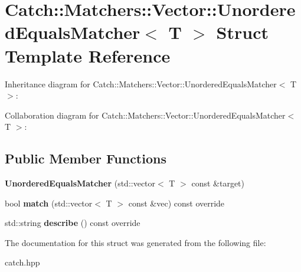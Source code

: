 \hypertarget{structCatch_1_1Matchers_1_1Vector_1_1UnorderedEqualsMatcher}{}\section{Catch\+:\+:Matchers\+:\+:Vector\+:\+:Unordered\+Equals\+Matcher$<$ T $>$ Struct Template Reference}
\label{structCatch_1_1Matchers_1_1Vector_1_1UnorderedEqualsMatcher}


Inheritance diagram for Catch\+:\+:Matchers\+:\+:Vector\+:\+:Unordered\+Equals\+Matcher$<$ T $>$\+:


Collaboration diagram for Catch\+:\+:Matchers\+:\+:Vector\+:\+:Unordered\+Equals\+Matcher$<$ T $>$\+:
\subsection*{Public Member Functions}
\begin{DoxyCompactItemize}
\item 
{\bfseries Unordered\+Equals\+Matcher} (std\+::vector$<$ T $>$ const \&target)\hypertarget{structCatch_1_1Matchers_1_1Vector_1_1UnorderedEqualsMatcher_a525905639b2b15b52ddb0bf14bfa19da}{}\label{structCatch_1_1Matchers_1_1Vector_1_1UnorderedEqualsMatcher_a525905639b2b15b52ddb0bf14bfa19da}

\item 
bool {\bfseries match} (std\+::vector$<$ T $>$ const \&vec) const override\hypertarget{structCatch_1_1Matchers_1_1Vector_1_1UnorderedEqualsMatcher_a3ccdd9dd2cd8bdbb8bb121acbb9cb358}{}\label{structCatch_1_1Matchers_1_1Vector_1_1UnorderedEqualsMatcher_a3ccdd9dd2cd8bdbb8bb121acbb9cb358}

\item 
std\+::string {\bfseries describe} () const override\hypertarget{structCatch_1_1Matchers_1_1Vector_1_1UnorderedEqualsMatcher_a7202d811200317abc58c844f663823df}{}\label{structCatch_1_1Matchers_1_1Vector_1_1UnorderedEqualsMatcher_a7202d811200317abc58c844f663823df}

\end{DoxyCompactItemize}


The documentation for this struct was generated from the following file\+:\begin{DoxyCompactItemize}
\item 
catch.\+hpp\end{DoxyCompactItemize}
